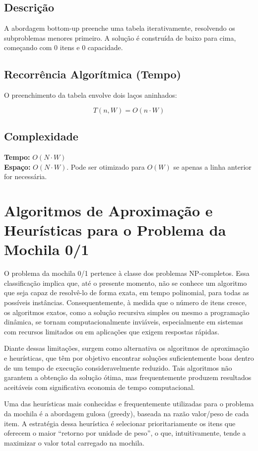 \subsection*{Descrição}
A abordagem bottom-up preenche uma tabela iterativamente, resolvendo os subproblemas menores primeiro. A solução é construída de baixo para cima, começando com 0 itens e 0 capacidade.

\subsection*{Recorrência Algorítmica (Tempo)}
O preenchimento da tabela envolve dois laços aninhados:

\[T(n, W) = O(n \cdot W)\]

\subsection*{Complexidade}
\textbf{Tempo:} \( O(N \cdot W) \) \\
\textbf{Espaço:} \( O(N \cdot W) \). Pode ser otimizado para \( O(W) \) se apenas a linha anterior for necessária.




\section{Algoritmos de Aproximação e Heurísticas para o Problema da Mochila 0/1}

O problema da mochila 0/1 pertence à classe dos problemas NP-completos. Essa classificação implica que, até o presente momento,
não se conhece um algoritmo que seja capaz de resolvê-lo de forma exata, em tempo polinomial, para todas as possíveis instâncias.
Consequentemente, à medida que o número de itens cresce, os algoritmos exatos, como a solução recursiva simples ou mesmo a programação dinâmica,
se tornam computacionalmente inviáveis, especialmente em sistemas com recursos limitados ou em aplicações que exigem respostas rápidas.

Diante dessas limitações, surgem como alternativa os algoritmos de aproximação e heurísticas, que têm por objetivo encontrar soluções suficientemente boas dentro de um tempo de execução consideravelmente reduzido. Tais algoritmos não garantem a obtenção da solução ótima, mas frequentemente produzem resultados aceitáveis com significativa economia de tempo computacional.

Uma das heurísticas mais conhecidas e frequentemente utilizadas para o problema da mochila é a abordagem gulosa (greedy), baseada na razão valor/peso de cada item.
A estratégia dessa heurística é selecionar prioritariamente os itens que oferecem o maior “retorno por unidade de peso”, o que, intuitivamente,
tende a maximizar o valor total carregado na mochila.


